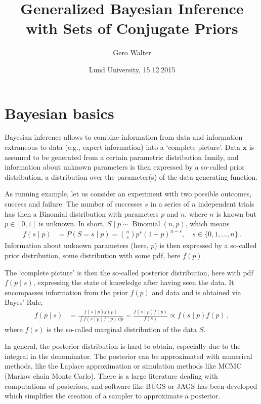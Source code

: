 \documentclass[12pt,a4paper	,twoside]{article}
\title{Generalized Bayesian Inference\\ with Sets of Conjugate Priors}
\author{Gero Walter}
\date{Lund University, 15.12.2015}
\newcommand{\dd}{\,\mathrm{d}}
\newcommand{\bs}[1]{\boldsymbol{#1}}
\renewcommand{\vec}[1]{{\bs#1}}
\newcommand{\bin}{\operatorname{Binomial}}
\begin{document}
\maketitle

\section{Bayesian basics}

Bayesian inference allows to combine information from data
and information extraneous to data (e.g., expert information)
into a `complete picture'.
Data $\vec{x}$ is assumed to be generated from a certain parametric distribution family,
and information about unknown parameters is then expressed by a so-called prior distribution,
a distribution over the parameter(s) of the data generating function.

As running example, let us consider an experiment with two possible outcomes,
success and failure. The number of successes $s$ in a series of $n$ independent trials
has then a Binomial distribution with parameters $p$ and $n$,
where $n$ is known but $p \in [0,1]$ is unknown.
In short, $S\mid p \sim \bin(n,p)$, which means
\begin{align}
f(s\mid p) &= P(S = s \mid p) = {n \choose s} p^s (1-p)^{n-s},\quad s \in \{0, 1, \ldots, n\}\,.
\label{eq:binompmf}
\end{align}
Information about unknown parameters (here, $p$) is then expressed
by a so-called prior distribution, some distribution with some pdf, here $f(p)$.

The `complete picture' is then the so-called posterior distribution,
here with pdf $f(p\mid s)$, expressing the state of knowledge after having seen the data.
It encompasses information from the prior $f(p)$ and data
and is obtained via Bayes' Rule,
\begin{align}
f(p \mid s) &= \frac{f(s\mid p) f(p)}{\int f(s\mid p) f(p) \dd p}
             = \frac{f(s\mid p) f(p)}{f(s)} \propto f(s\mid p) f(p)\,,
\label{eq:bayesrule}
\end{align}
where $f(s)$ is the so-called marginal distribution of the data $S$.

In general, the posterior distribution is hard to obtain,
especially due to the integral in the denominator.
The posterior can be approximated with numerical methods,
like the Laplace approximation or simulation methods like MCMC (Markov chain Monte Carlo).
There is a large literature dealing with computations of posteriors,
and software like BUGS or JAGS has been developed
which simplifies the creation of a sampler to approximate a posterior.
\end{document}

